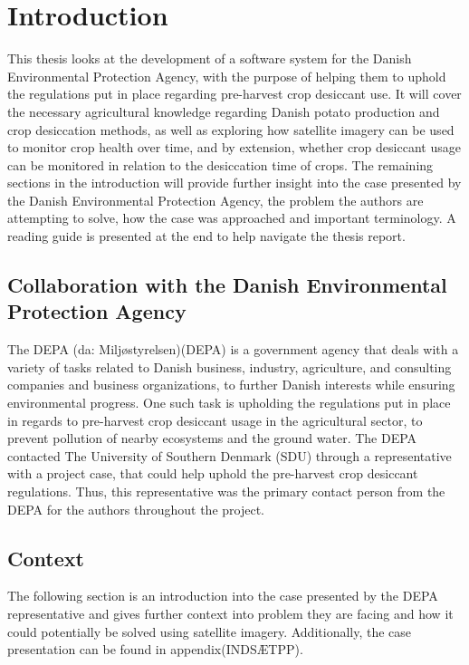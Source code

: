 \chapter{Introduction} \label{Intoduction}
This thesis looks at the development of a software system for the Danish Environmental Protection Agency, with the purpose of helping them to uphold the regulations put in place regarding pre-harvest crop desiccant use. It will cover the necessary agricultural knowledge regarding Danish potato production and crop desiccation methods, as well as exploring how satellite imagery can be used to monitor crop health over time, and by extension, whether crop desiccant usage can be monitored in relation to the desiccation time of crops. The remaining sections in the introduction will provide further insight into the case presented by the Danish Environmental Protection Agency, the problem the authors are attempting to solve, how the case was approached and important terminology. A reading guide is presented at the end to help navigate the thesis report.

\section{Collaboration with the Danish Environmental Protection Agency}
The \acrfull{DEPA} (da: Miljøstyrelsen)(DEPA) is a government agency that deals with a variety of tasks related to Danish business, industry, agriculture, and consulting companies and business organizations, to further Danish interests while ensuring environmental progress\cite{MiljøstyrelsenOpgaver}. One such task is upholding the regulations put in place in regards to pre-harvest crop desiccant usage in the agricultural sector, to prevent pollution of nearby ecosystems and the ground water. The \acrshort{DEPA} contacted The University of Southern Denmark (SDU) through a representative with a project case, that could help uphold the pre-harvest crop desiccant regulations. Thus, this representative was the primary contact person from the DEPA for the authors throughout the project.


\section{Context}
The following section is an introduction into the case presented by the DEPA representative and gives further context into problem they are facing and how it could potentially be solved using satellite imagery. Additionally, the case presentation can be found in appendix(INDSÆTPP).

